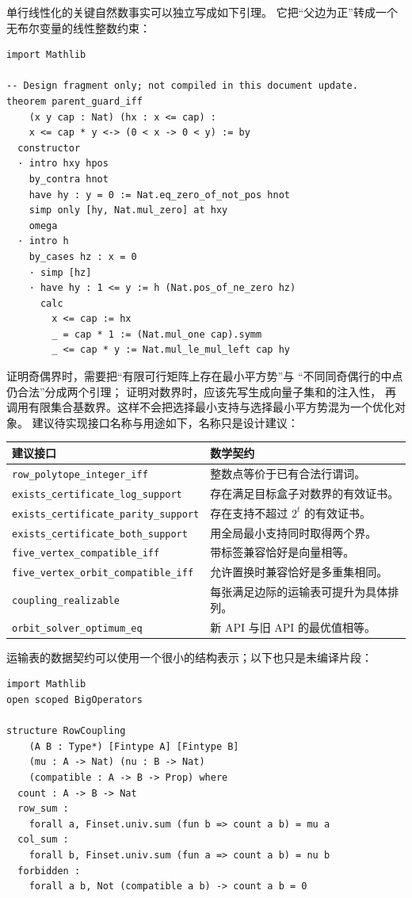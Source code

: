 \documentclass[UTF8,a4paper,11pt,fontset=fandol]{ctexart}
\theoremstyle{definition}
\newcommand{\repo}[1]{\nolinkurl{#1}}
\begin{document}
单行线性化的关键自然数事实可以独立写成如下引理。
它把“父边为正”转成一个无布尔变量的线性整数约束：
\begin{lstlisting}
import Mathlib

-- Design fragment only; not compiled in this document update.
theorem parent_guard_iff
    (x y cap : Nat) (hx : x <= cap) :
    x <= cap * y <-> (0 < x -> 0 < y) := by
  constructor
  · intro hxy hpos
    by_contra hnot
    have hy : y = 0 := Nat.eq_zero_of_not_pos hnot
    simp only [hy, Nat.mul_zero] at hxy
    omega
  · intro h
    by_cases hz : x = 0
    · simp [hz]
    · have hy : 1 <= y := h (Nat.pos_of_ne_zero hz)
      calc
        x <= cap := hx
        _ = cap * 1 := (Nat.mul_one cap).symm
        _ <= cap * y := Nat.mul_le_mul_left cap hy
\end{lstlisting}

证明奇偶界时，需要把“有限可行矩阵上存在最小平方势”与
“不同同奇偶行的中点仍合法”分成两个引理；
证明对数界时，应该先写生成向量子集和的注入性，
再调用有限集合基数界。这样不会把选择最小支持与选择最小平方势混为一个优化对象。
建议待实现接口名称与用途如下，名称只是设计建议：
\begin{center}
\begin{tabular}{p{}p{}}
\toprule
建议接口 & 数学契约\\ \midrule
\repo{row_polytope_integer_iff} & 整数点等价于已有合法行谓词。\\
\repo{exists_certificate_log_support} & 存在满足目标盒子对数界的有效证书。\\
\repo{exists_certificate_parity_support} & 存在支持不超过 $2^t$ 的有效证书。\\
\repo{exists_certificate_both_support} & 用全局最小支持同时取得两个界。\\
\repo{five_vertex_compatible_iff} & 带标签兼容恰好是向量相等。\\
\repo{five_vertex_orbit_compatible_iff} & 允许置换时兼容恰好是多重集相同。\\
\repo{coupling_realizable} & 每张满足边际的运输表可提升为具体排列。\\
\repo{orbit_solver_optimum_eq} & 新 API 与旧 API 的最优值相等。\\
\bottomrule
\end{tabular}
\end{center}

运输表的数据契约可以使用一个很小的结构表示；以下也只是未编译片段：
\begin{lstlisting}
import Mathlib
open scoped BigOperators

structure RowCoupling
    (A B : Type*) [Fintype A] [Fintype B]
    (mu : A -> Nat) (nu : B -> Nat)
    (compatible : A -> B -> Prop) where
  count : A -> B -> Nat
  row_sum :
    forall a, Finset.univ.sum (fun b => count a b) = mu a
  col_sum :
    forall b, Finset.univ.sum (fun a => count a b) = nu b
  forbidden :
    forall a b, Not (compatible a b) -> count a b = 0
\end{lstlisting}
\end{document}
